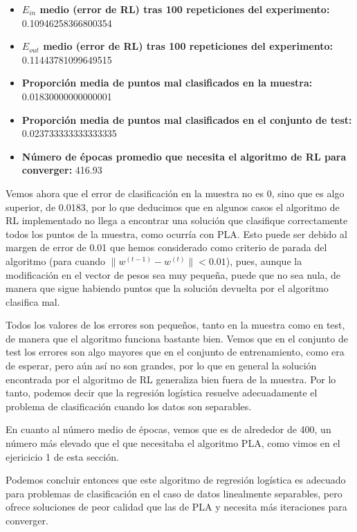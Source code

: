 \documentclass[a4]{article}
\begin{document}
\begin{itemize}
	\item \textbf{$ E_{in} $ medio (error de RL) tras 100 repeticiones del experimento:} 0.10946258366800354
	\item \textbf{ $E_{out}$ medio (error de RL) tras 100 repeticiones del experimento:} 0.11443781099649515
	\item \textbf{Proporción media de puntos mal clasificados en la muestra:} 0.01830000000000001
	\item \textbf{Proporción media de puntos mal clasificados en el conjunto de test:} 0.023733333333333335
	\item \textbf{Número de épocas promedio que necesita el algoritmo de RL para converger:} 416.93
	
\end{itemize}

Vemos ahora que el error de clasificación en la muestra no es 0, sino que es algo superior, de 0.0183, por lo que deducimos que en algunos casos el algoritmo de RL implementado no llega a encontrar una solución que clasifique correctamente todos los puntos de la muestra, como ocurría con PLA. Esto puede ser debido al margen de error de 0.01 que hemos considerado como criterio de parada del algoritmo (para cuando $\|w^{(t-1)}-w^{(t)}\|<0.01$), pues, aunque la modificación en el vector de pesos sea muy pequeña, puede que no sea nula, de manera que sigue habiendo puntos que la solución devuelta por el algoritmo clasifica mal. 

Todos los valores de los errores son pequeños, tanto en la muestra como en test, de manera que el algoritmo funciona bastante bien. Vemos que en el conjunto de test los errores son algo mayores que en el conjunto de entrenamiento, como era de esperar, pero aún así no son grandes, por lo que en general la solución encontrada por el algoritmo de RL generaliza bien fuera de la muestra. Por lo tanto, podemos decir que la regresión logística resuelve adecuadamente el problema de clasificación cuando los datos son separables. 

En cuanto al número medio de épocas, vemos que es de alrededor de 400, un número más elevado que el que necesitaba el algoritmo PLA, como vimos en el ejericicio 1 de esta sección. 

Podemos concluir entonces que este algoritmo de regresión logística es adecuado para problemas de clasificación en el caso de datos linealmente separables, pero ofrece soluciones de peor calidad que las de PLA y necesita más iteraciones para converger. 
 
\end{document}
